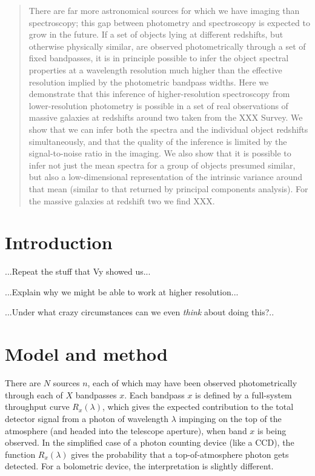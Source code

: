 \documentclass[12pt,preprint,letterpaper]{aastex}
\begin{document}
\author{by Ross~Fadely, David~W.~Hogg, and others}

\begin{abstract}
There are far more astronomical sources for which we have imaging than spectroscopy;
  this gap between photometry and spectroscopy is expected to grow in the future.
If a set of objects lying at different redshifts,
  but otherwise physically similar,
  are observed photometrically through a set of fixed bandpasses,
  it is in principle possible to infer the object spectral properties at a wavelength resolution
  much higher than the effective resolution implied by the photometric bandpass widths.
Here we demonstrate that this inference of higher-resolution spectroscopy
  from lower-resolution photometry
  is possible in a set of real observations of massive galaxies at redshifts around two
  taken from the XXX Survey.
We show that we can infer both the spectra and the individual object redshifts simultaneously,
  and that the quality of the inference is limited by the signal-to-noise ratio in the imaging.
We also show that it is possible to infer not just the mean spectra for a group of objects presumed similar,
  but also a low-dimensional representation of the intrinsic variance around that mean
  (similar to that returned by principal components analysis).
For the massive galaxies at redshift two we find XXX.
\end{abstract}

\section{Introduction}

...Repeat the stuff that Vy showed us...

...Explain why we might be able to work at higher resolution...

...Under what crazy circumstances can we even \emph{think} about doing this?..

\section{Model and method}

There are $N$ sources $n$, each of which may have been observed photometrically through each of $X$ bandpasses $x$.
Each bandpass $x$ is defined by a full-system throughput curve $R_x(\lambda)$,
  which gives the expected contribution to the total detector signal from a photon of wavelength $\lambda$
  impinging on the top of the atmosphere (and headed into the telescope aperture),
  when band $x$ is being observed.
In the simplified case of a photon counting device (like a CCD),
  the function $R_x(\lambda)$ gives the probability that a top-of-atmosphere photon gets detected.
For a bolometric device, the interpretation is slightly different.
\end{document}
